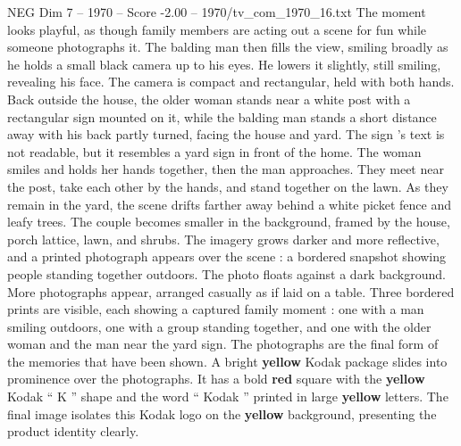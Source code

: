 \begin{textsample}{NEG Dim 7 – 1970 – Score -2.00 – 1970/tv\_com\_1970\_16.txt}
The moment looks playful, as though family members are acting out a scene for fun while someone photographs it.
The balding man then fills the view, smiling broadly as he holds a small black camera up to his eyes.
He lowers it slightly, still smiling, revealing his face.
The camera is compact and rectangular, held with both hands.
Back outside the house, the older woman stands near a white post with a rectangular sign mounted on it, while the balding man stands a short distance away with his back partly turned, facing the house and yard.
The sign ’s text is not readable, but it resembles a yard sign in front of the home.
The woman smiles and holds her hands together, then the man approaches.
They meet near the post, take each other by the hands, and stand together on the lawn.
As they remain in the yard, the scene drifts farther away behind a white picket fence and leafy trees.
The couple becomes smaller in the background, framed by the house, porch lattice, lawn, and shrubs.
The imagery grows darker and more reflective, and a printed photograph appears over the scene : a bordered snapshot showing people standing together outdoors.
The photo floats against a dark background.
More photographs appear, arranged casually as if laid on a table.
Three bordered prints are visible, each showing a captured family moment : one with a man smiling outdoors, one with a group standing together, and one with the older woman and the man near the yard sign.
The photographs are the final form of the memories that have been shown.
A bright \textbf{yellow} Kodak package slides into prominence over the photographs.
It has a bold \textbf{red} square with the \textbf{yellow} Kodak “ K ” shape and the word “ Kodak ” printed in large \textbf{yellow} letters.
The final image isolates this Kodak logo on the \textbf{yellow} background, presenting the product identity clearly.

\end{textsample}
